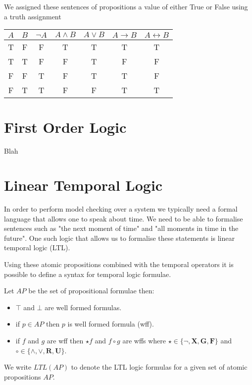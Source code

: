 We assigned these sentences of propositions a value of either True or False using a truth assignment 
\begin{center}
\begin{tabular}{c | c | c | c | c | c | c} \hline
$A$ & $B$ & $\neg A$  & $A \wedge B$ & $A \vee B$ & $A \to B$ & $A \leftrightarrow B$  \\ \hline
 T & F & F  & T & T & T & T \\ \hline 
 T & T & F  & F & T & F & F \\ \hline
 F & F & T  & F & T & T & F \\ \hline
 F & T & T  & F & F & T & T \\ 
\end{tabular}
\end{center}

\section{First Order Logic}
\begin{mydef}
Blah

\end{mydef}

\begin{mydef}

\end{mydef}

\section{Linear Temporal Logic}
In order to perform model checking over a system we typically need a formal language that allows one to speak about time. We need to be able to formalise sentences such as "the next moment of time" and "all moments in time in the future". One such logic that allows us to formalise these statements is linear temporal logic (LTL)\cite{AP77}. 


Using these atomic propositions combined with the temporal operators it is possible to define a syntax for temporal logic formulae.

\begin{mydef}
Let $AP$ be the set of propositional formulae then:

\begin{itemize}
\item $\top$ and $\bot$ are well formed formulas.
\item if $p \in AP$ then $p$ is well formed formula (wff).

\item if $f$ and $g$ are wff  then $\star f$ and $f \circ g$ are wffs where $\star \in \{\neg,\mathbf{X},\mathbf{G}, \mathbf{F}\}$ and $\circ \in \{ \wedge,\vee,\textbf{R},\textbf{U} \}$.
\end{itemize}

\end{mydef}
We write $LTL(AP)$ to denote the LTL logic formulas for a given set of atomic propositions $AP$.

